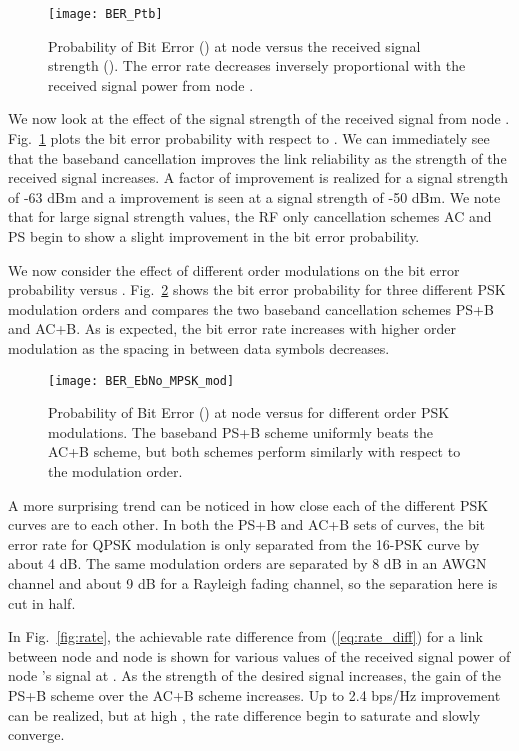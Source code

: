 \documentclass[12pt, journal,draftcls,letterpaper,onecolumn]{IEEEtran}
\begin{document}
\begin{figure}[htp]  
\begin{center} 
  \texttt{[image: BER\_Ptb]}
\caption[fig:chan_ang]{Probability of Bit Error () at node  versus the received signal strength (). The error rate decreases inversely proportional with the received signal power from node .}  
  \label{fig:BER_Prb}
\end{center} 
\end{figure} 
We now look at the effect of the signal strength  of the received signal from node .  Fig.~\ref{fig:BER_Prb} plots the bit error probability with respect to .  We can immediately see that the baseband cancellation improves the link reliability as the strength of the received signal increases.  A factor of  improvement is realized for a signal strength of -63 dBm and a  improvement is seen at a signal strength of -50 dBm.  We note that for large signal strength values, the RF only cancellation schemes AC and PS begin to show a slight improvement in the bit error probability.

We now consider the effect of different order modulations on the bit error probability versus .  Fig.~\ref{fig:BER_MPSK} shows the bit error probability  for three different PSK modulation orders and compares the two baseband cancellation schemes PS+B and AC+B.  As is expected, the bit error rate increases with higher order modulation as the spacing in between data symbols decreases.  
\begin{figure}[htp] 
\begin{center} 
  \texttt{[image: BER\_EbNo\_MPSK\_mod]}
\caption[fig:BER_MPSK]{Probability of Bit Error () at node  versus  for different order PSK modulations.  The baseband PS+B scheme uniformly beats the AC+B scheme, but both schemes perform similarly with respect to the modulation order.  }  
  \label{fig:BER_MPSK} 
\end{center} 
\end{figure} 
A more surprising trend can be noticed in how close each of the different PSK curves are to each other.  In both the PS+B and AC+B sets of curves, the bit error rate for QPSK modulation is only separated from the 16-PSK curve by about 4 dB.  The same modulation orders are separated by 8 dB in an AWGN channel and about 9 dB for a Rayleigh fading channel, so the separation here is cut in half.  

In Fig.~\ref{fig:rate}, the achievable rate difference from (\ref{eq:rate_diff}) for a link between node  and node  is shown for various values of the received signal power of node 's signal at .  As the strength of the desired signal increases, the gain of the PS+B scheme over the AC+B scheme increases.  Up to 2.4 bps/Hz improvement can be realized, but at high , the rate difference begin to saturate and slowly converge. 
\end{document}
